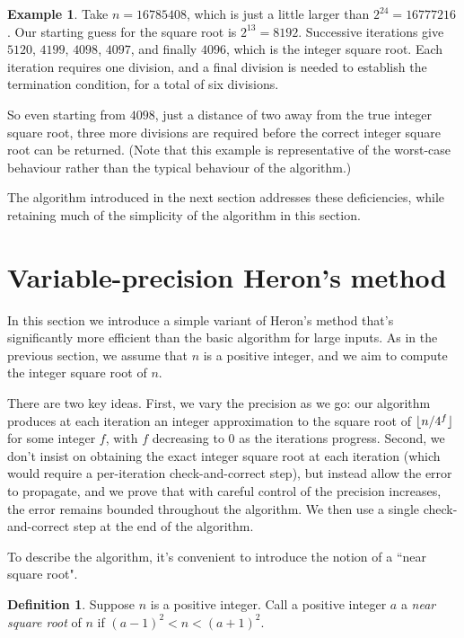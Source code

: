 \documentclass[a4paper]{article}
\DeclarePairedDelimiter\floor{\lfloor}{\rfloor}
\theoremstyle{plain}
\theoremstyle{definition}
\newtheorem{definition}[theorem]{Definition}
\newtheorem{example}[theorem]{Example}
\begin{document}
\begin{example}
  Take $n = 16785408$, which is just a little larger than $2^{24} = 16777216$.
  Our starting guess for the square root is $2^{13} = 8192$. Successive
  iterations give $5120$, $4199$, $4098$, $4097$, and finally $4096$, which
  is the integer square root. Each iteration requires one division, and
  a final division is needed to establish the termination condition, for
  a total of six divisions.
\end{example}

So even starting from $4098$, just a distance of two away from the true integer
square root, three more divisions are required before the correct integer
square root can be returned. (Note that this example is representative of the
worst-case behaviour rather than the typical behaviour of the algorithm.)

The algorithm introduced in the next section addresses these deficiencies,
while retaining much of the simplicity of the algorithm in this section.

\section{Variable-precision Heron's method}
\label{new_method}

In this section we introduce a simple variant of Heron's method that's
significantly more efficient than the basic algorithm for large inputs. As in
the previous section, we assume that $n$ is a positive integer, and we aim to
compute the integer square root of $n$.

There are two key ideas. First, we vary the precision as we go: our algorithm
produces at each iteration an integer approximation to the square root of
$\floor{n/4^f}$ for some integer $f$, with $f$ decreasing to $0$ as the
iterations progress. Second, we don't insist on obtaining the exact integer
square root at each iteration (which would require a per-iteration
check-and-correct step), but instead allow the error to propagate, and we prove
that with careful control of the precision increases, the error remains bounded
throughout the algorithm. We then use a single check-and-correct step
at the end of the algorithm.

To describe the algorithm, it's convenient to introduce the notion of a
``near square root".

\begin{definition}
  Suppose $n$ is a positive integer. Call a positive integer $a$ a
  \emph{near square root} of $n$ if $(a - 1)^2 < n < (a + 1)^2$.
\end{definition}
\end{document}

